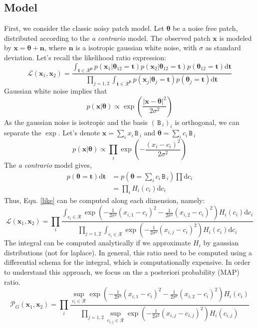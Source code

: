 \documentclass[runningheads]{llncs}
\newcommand{\mat}[1]{\ensuremath{\,\mathtt{#1}\,}}
\newcommand{\thetab}{\boldsymbol\theta}
\newcommand{\xb}{\mathbf{x}}
\newcommand{\nb}{\mathbf{n}}
\newcommand{\dt}{\mathrm{d}\mathbf{t}}
\begin{document}
\subsection{Model}
First, we consider the classic noisy patch model. Let $\thetab$ be a noise free patch, distributed according to the \textit{a contrario} model. The observed patch $\xb$ is modeled by $\xb=\thetab + \nb$, where $\nb$ is a isotropic gaussian white noise, with $\sigma$ as standard deviation.  
Let's recall the likelihood ratio expression:
\begin{equation}
 \mathcal{L}(\mathbf{x}_1,\mathbf{x}_2)=
\frac{\int_{\mathbf{t \in \mathcal{R}^p}} p(\mathbf{x}_1|\boldsymbol{\theta}_{12}=\mathbf{t}) p(\mathbf{x}_2|\boldsymbol{\theta}_{12}=\mathbf{t})p(\boldsymbol{\theta}_{12}=\mathbf{t})\mathrm{d}\mathbf{t}}{\prod_{j=1,2}\int_{\mathbf{t \in \mathcal{R}^p}} p(\mathbf{x}_j|\boldsymbol{\theta}_{j}=\mathbf{t}) p(\boldsymbol{\theta}_{j}=\mathbf{t})\mathrm{d}\mathbf{t}}
\label{like}
\end{equation}
Gaussian white noise implies that 
\[
p(\xb|\thetab)\propto\exp\left(\frac{|\mathbf{x}-\boldsymbol\theta|^2}{2\sigma^2}\right)
\]
As the gaussian noise is isotropic and the basis $(\mat{B}_i)_i$ is orthogonal, we can separate the $\exp$. Let's denote $\xb=\sum_i x_i \mat{B}_i$ and $\thetab=\sum_i c_i \mat{B}_i$
\[
p(\xb|\thetab)\propto \prod_i \exp(-\frac{(x_i-c_i )^2}{2\sigma^2})
\]
The \textit{a contrario} model gives,
\[
\begin{split}
p(\thetab=\mathbf{t})\dt &=p(\thetab=\sum_i c_i \mat{B}_i) \prod \mathrm{d} c_i\\
&=\prod_i H_i(c_i) \mathrm{d} c_i
\end{split}
\]
Thus, Equ. \ref{like} can be computed along each dimension, namely:
\begin{equation}
 \mathcal{L}(\mathbf{x}_1,\mathbf{x}_2)=\prod_i \frac{\int_{c_i\in \mathcal{R}} \exp(-\frac{1}{2\sigma^2}(x_{i,1}-c_i )^2 -\frac{1}{2\sigma^2}(x_{i,2}-c_i )^2) H_i(c_i) \mathrm{d} c_i }
 {\prod_{j=1,2}\int_{c_i\in \mathcal{R}} \exp(-\frac{1}{2\sigma^2}(x_{i,j}-c_i )^2) H_i(c_i) \mathrm{d} c_i }
\end{equation}
The integral can be computed analytically if we approximate $H_i$ by gaussian distributions (not for laplace). In general, this ratio 
need to be computed using a differential schema for the integral, which is computationally expensive. In order to understand this approach, we focus on the a posteriori probability (MAP) ratio.
\begin{equation}
 \mathcal{P}_G (\mathbf{x}_1,\mathbf{x}_2)=\prod_i \frac{\sup_{c_i\in \mathcal{R}} \exp(-\frac{1}{2\sigma^2}(x_{i,1}-c_i )^2 -\frac{1}{2\sigma^2}(x_{i,2}-c_i )^2) H_i(c_i)  }
 {\prod_{j=1,2}\sup_{c_{i,j}\in \mathcal{R}} \exp(-\frac{1}{2\sigma^2}(x_{i,j}-c_{i,j} )^2) H_i(c_{i,j})  }
\end{equation}
\end{document}
